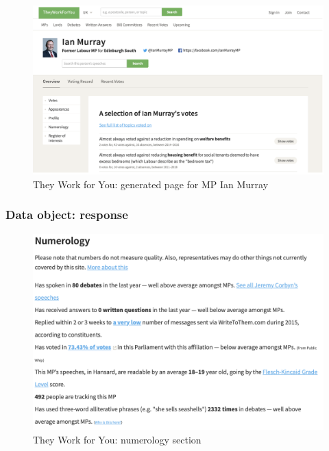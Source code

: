 \documentclass{article}
\begin{document}
			\begin{figure}
				\centering
				\includegraphics[scale=0.5]{images/they-work-for-you-ian-murray}
				\caption{They Work for You: generated page for MP Ian Murray}
				\label{fig:they-work-for-you-ian-murray}
			\end{figure}
			
        	\subsubsection*{Data object: response}
        	

			\begin{figure}
				\centering
				\includegraphics[scale=0.5]{images/they-work-for-you-numerology}
				\caption{They Work for You: numerology section}
				\label{fig:they-work-for-you-numerology}
			\end{figure}
\end{document}
